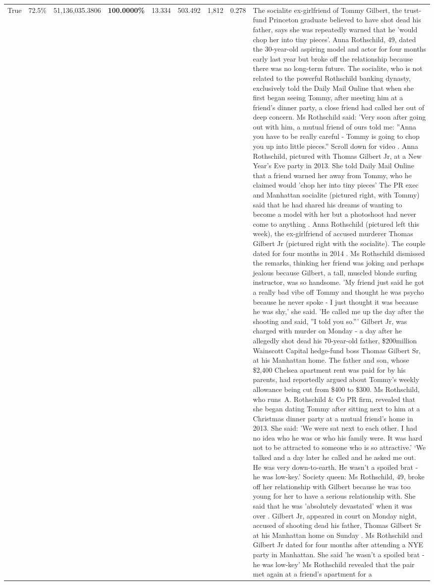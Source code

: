 \begin{table}[H]
\begin{tabular}{lllrlllll}
True & 72.5\% & 51,136,035.3806 & \bfseries \color{red} 100.0000\% & 13.334 & 503.492 & 1,812 & 0.278 & The socialite ex-girlfriend of Tommy Gilbert, the trust-fund Princeton graduate believed to have shot dead his father, says she was repeatedly warned that he 'would chop her into tiny pieces'. Anna Rothschild, 49, dated the 30-year-old aspiring model and actor for four months early last year but broke off the relationship because there was no long-term future. The socialite, who is not related to the powerful Rothschild banking dynasty, exclusively told the Daily Mail Online that when she first began seeing Tommy, after meeting him at a friend's dinner party, a close friend had called her out of deep concern. Ms Rothschild said: 'Very soon after going out with him, a mutual friend of ours told me: ''Anna you have to be really careful - Tommy is going to chop you up into little pieces.'' Scroll down for video . Anna Rothschild, pictured with Thomas Gilbert Jr, at a New Year's Eve party in 2013. She told Daily Mail Online that a friend warned her away from Tommy, who he claimed would 'chop her into tiny pieces' The PR exec and Manhattan socialite (pictured right, with Tommy) said that he had shared his dreams of wanting to become a model with her but a photoshoot had never come to anything . Anna Rothschild (pictured left this week), the ex-girlfriend of accused murderer Thomas Gilbert Jr (pictured right with the socialite). The couple dated for four months in 2014 . Ms Rothschild dismissed the remarks, thinking her friend was joking and perhaps jealous because Gilbert, a tall, muscled blonde surfing instructor, was so handsome. 'My friend just said he got a really bad vibe off Tommy and thought he was psycho because he never spoke - I just thought it was because he was shy,' she said. 'He called me up the day after the shooting and said, ''I told you so.''' Gilbert Jr, was charged with murder on Monday - a day after he allegedly shot dead his 70-year-old father, \$200million Wainscott Capital hedge-fund boss Thomas Gilbert Sr, at his Manhattan home. The father and son, whose \$2,400 Chelsea apartment rent was paid for by his parents, had reportedly argued about Tommy's weekly allowance being cut from \$400 to \$300. Ms Rothschild, who runs A. Rothschild \& Co PR firm, revealed that she began dating Tommy after sitting next to him at a Christmas dinner party at a mutual friend's home in 2013. She said: 'We were sat next to each other. I had no idea who he was or who his family were. It was hard not to be attracted to someone who is so attractive.' ‘We talked and a day later he called and he asked me out. He was very down-to-earth. He wasn’t a spoiled brat - he was low-key.’ Society queen: Ms Rothschild, 49, broke off her relationship with Gilbert because he was too young for her to have a serious relationship with. She said that he was 'absolutely devastated' when it was over . Gilbert Jr, appeared in court on Monday night, accused of shooting dead his father, Thomas Gilbert Sr at his Manhattan home on Sunday . Ms Rothschild and Gilbert Jr dated for four months after attending a NYE party in Manhattan. She said 'he wasn't a spoiled brat - he was low-key' Ms Rothschild revealed that the pair met again at a friend’s apartment for a 
\end{tabular}
\end{table}

